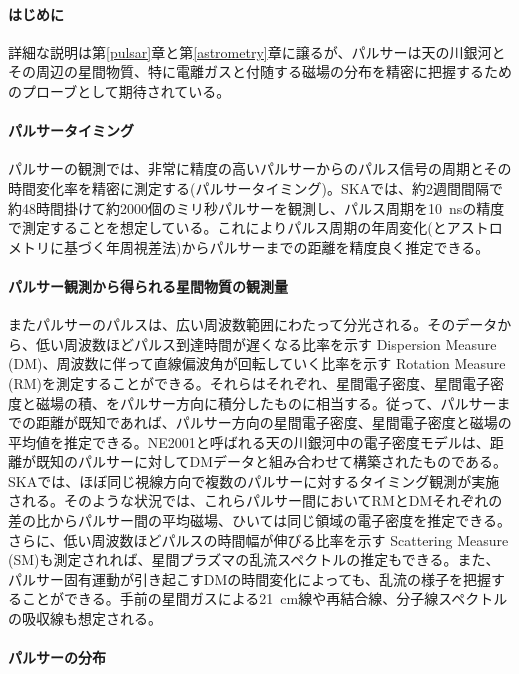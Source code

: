 \paragraph{はじめに}

詳細な説明は第\ref{pulsar}章と第\ref{astrometry}章に譲るが、パルサーは天の川銀河とその周辺の星間物質、特に電離ガスと付随する磁場の分布を精密に把握するためのプローブとして期待されている。

\paragraph{パルサータイミング}

パルサーの観測では、非常に精度の高いパルサーからのパルス信号の周期とその時間変化率を精密に測定する(パルサータイミング)。SKAでは、約2週間間隔で約48時間掛けて約2000個のミリ秒パルサーを観測し、パルス周期を10~nsの精度で測定することを想定している。これによりパルス周期の年周変化(とアストロメトリに基づく年周視差法)からパルサーまでの距離を精度良く推定できる。

\paragraph{パルサー観測から得られる星間物質の観測量}

またパルサーのパルスは、広い周波数範囲にわたって分光される。そのデータから、低い周波数ほどパルス到達時間が遅くなる比率を示す Dispersion Measure (DM)、周波数に伴って直線偏波角が回転していく比率を示す Rotation Measure (RM)を測定することができる。それらはそれぞれ、星間電子密度、星間電子密度と磁場の積、をパルサー方向に積分したものに相当する。従って、パルサーまでの距離が既知であれば、パルサー方向の星間電子密度、星間電子密度と磁場の平均値を推定できる。NE2001と呼ばれる天の川銀河中の電子密度モデルは\citep{2002astro.ph..7156C}、距離が既知のパルサーに対してDMデータと組み合わせて構築されたものである。SKAでは、ほぼ同じ視線方向で複数のパルサーに対するタイミング観測が実施される。そのような状況では、これらパルサー間においてRMとDMそれぞれの差の比からパルサー間の平均磁場、ひいては同じ領域の電子密度を推定できる。さらに、低い周波数ほどパルスの時間幅が伸びる比率を示す Scattering Measure (SM)も測定されれば、星間プラズマの乱流スペクトルの推定もできる。また、パルサー固有運動が引き起こすDMの時間変化によっても、乱流の様子を把握することができる。手前の星間ガスによる21~cm線や再結合線、分子線スペクトルの吸収線も想定される。

\paragraph{パルサーの分布}

